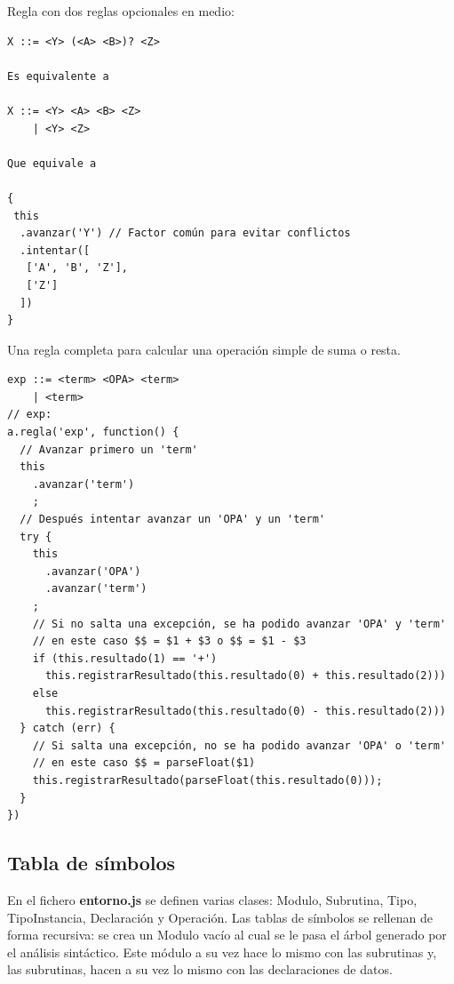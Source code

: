 \documentclass{report}
\begin{document}
	\vspace{10px}
	
	Regla con dos reglas opcionales en medio:
	
	\begin{BVerbatim}
X ::= <Y> (<A> <B>)? <Z>

Es equivalente a

X ::= <Y> <A> <B> <Z>
    | <Y> <Z>
    
Que equivale a

{
 this
  .avanzar('Y') // Factor común para evitar conflictos
  .intentar([
   ['A', 'B', 'Z'],
   ['Z']
  ])
}
	\end{BVerbatim}
	
	\vspace{10px}
	
	Una regla completa para calcular una operación simple de suma o resta.
	
\begin{BVerbatim}
exp ::= <term> <OPA> <term>     
    | <term>                
// exp:
a.regla('exp', function() {
  // Avanzar primero un 'term'
  this
    .avanzar('term')
    ;
  // Después intentar avanzar un 'OPA' y un 'term'
  try {
    this
      .avanzar('OPA')
      .avanzar('term')
    ;
    // Si no salta una excepción, se ha podido avanzar 'OPA' y 'term'
    // en este caso $$ = $1 + $3 o $$ = $1 - $3 
    if (this.resultado(1) == '+')
      this.registrarResultado(this.resultado(0) + this.resultado(2)))
    else
      this.registrarResultado(this.resultado(0) - this.resultado(2)))
  } catch (err) {
    // Si salta una excepción, no se ha podido avanzar 'OPA' o 'term'
    // en este caso $$ = parseFloat($1)
    this.registrarResultado(parseFloat(this.resultado(0)));
  }
})
\end{BVerbatim}

	\subsection{Tabla de símbolos}
	
	En el fichero \textbf{entorno.js} se definen varias clases: Modulo, Subrutina, Tipo, TipoInstancia, Declaración y Operación. Las tablas de símbolos se rellenan de forma recursiva: se crea un Modulo vacío al cual se le pasa el árbol generado por el análisis sintáctico. Este módulo a su vez hace lo mismo con las subrutinas y, las subrutinas, hacen a su vez lo mismo con las declaraciones de datos.
	
	\vspace{10px}
	
\end{document}
